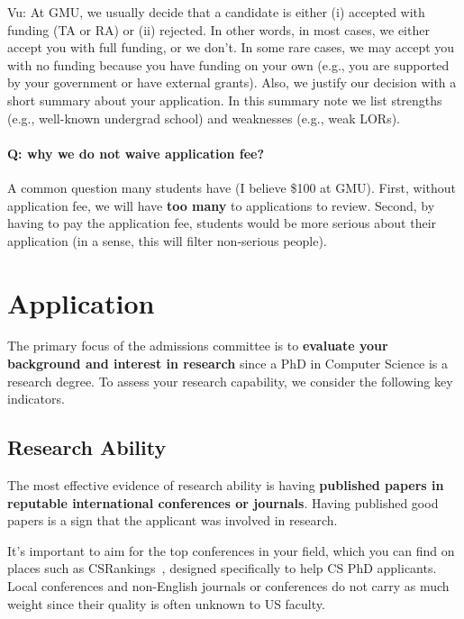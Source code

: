 \documentclass[10pt]{article}
\begin{document}
\begin{tcolorbox}[left=1pt,right=1pt,top=1pt,bottom=1pt]
Vu: At GMU, we usually decide that a candidate is either (i) accepted with funding (TA or RA) or (ii) rejected. In other words, in most cases, we either
accept you with full funding, or we don't. In some rare cases, we may accept
you with no funding because you have funding on your own (e.g., you are
supported by your government or have external grants). Also, we justify
our decision with a short summary about your application. In this summary note we list
strengths (e.g., well-known undergrad school) and weaknesses (e.g., weak
LORs).
\end{tcolorbox}

\paragraph{Q: why we do not waive application fee?}  A common question many students have (I believe \$100 at GMU). First, without application fee, we will have \textbf{too many} to applications to review.  Second, by having to pay the application fee, students would be more serious about their application (in a sense, this will filter non-serious people).

\section{Application}\label{sec:application}

The primary focus of the admissions committee is to \textbf{evaluate your background and interest in research} since a PhD in Computer Science
is a research degree. To assess your research capability, we consider
the following key indicators.

\subsection{Research Ability}

The most effective evidence of research ability is having \textbf{published papers in reputable international conferences or journals}.
Having published good papers is a sign that the applicant was involved in research.

It's important to aim for the top conferences in your field, which you can
find on places such as CSRankings~\cite{csrankings}, designed specifically to help CS PhD
applicants. Local conferences and non-English journals or conferences do
not carry as much weight since their quality is often unknown to US
faculty.
\end{document}
